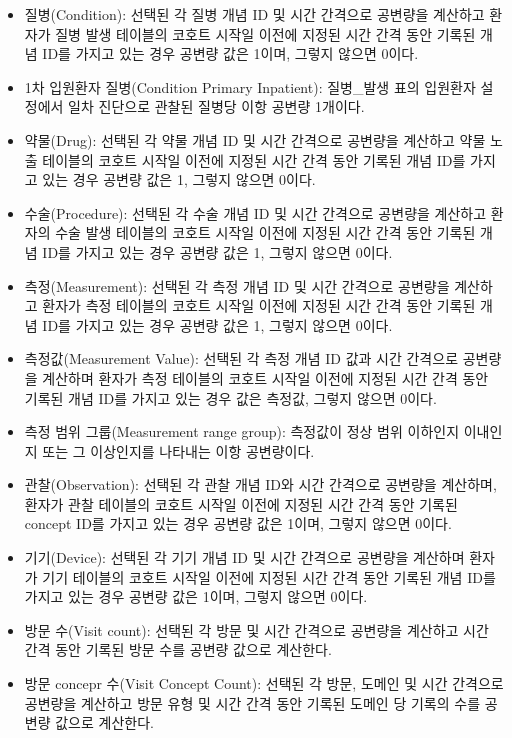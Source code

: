 \documentclass[11pt]{book}
\providecommand{\tightlist}{%
  \setlength{\itemsep}{0pt}\setlength{\parskip}{0pt}}
\theoremstyle{definition}
\theoremstyle{definition}
\theoremstyle{definition}
\theoremstyle{remark}
\begin{document}
\begin{itemize}
\tightlist
\item
  질병(Condition): 선택된 각 질병 개념 ID 및 시간 간격으로 공변량을
  계산하고 환자가 질병 발생 테이블의 코호트 시작일 이전에 지정된 시간
  간격 동안 기록된 개념 ID를 가지고 있는 경우 공변량 값은 1이며, 그렇지
  않으면 0이다.
\item
  1차 입원환자 질병(Condition Primary Inpatient): 질병\_발생 표의
  입원환자 설정에서 일차 진단으로 관찰된 질병당 이항 공변량 1개이다.
\item
  약물(Drug): 선택된 각 약물 개념 ID 및 시간 간격으로 공변량을 계산하고
  약물 노출 테이블의 코호트 시작일 이전에 지정된 시간 간격 동안 기록된
  개념 ID를 가지고 있는 경우 공변량 값은 1, 그렇지 않으면 0이다.
\item
  수술(Procedure): 선택된 각 수술 개념 ID 및 시간 간격으로 공변량을
  계산하고 환자의 수술 발생 테이블의 코호트 시작일 이전에 지정된 시간
  간격 동안 기록된 개념 ID를 가지고 있는 경우 공변량 값은 1, 그렇지
  않으면 0이다.
\item
  측정(Measurement): 선택된 각 측정 개념 ID 및 시간 간격으로 공변량을
  계산하고 환자가 측정 테이블의 코호트 시작일 이전에 지정된 시간 간격
  동안 기록된 개념 ID를 가지고 있는 경우 공변량 값은 1, 그렇지 않으면
  0이다.
\item
  측정값(Measurement Value): 선택된 각 측정 개념 ID 값과 시간 간격으로
  공변량을 계산하며 환자가 측정 테이블의 코호트 시작일 이전에 지정된
  시간 간격 동안 기록된 개념 ID를 가지고 있는 경우 값은 측정값, 그렇지
  않으면 0이다.
\item
  측정 범위 그룹(Measurement range group): 측정값이 정상 범위 이하인지
  이내인지 또는 그 이상인지를 나타내는 이항 공변량이다.
\item
  관찰(Observation): 선택된 각 관찰 개념 ID와 시간 간격으로 공변량을
  계산하며, 환자가 관찰 테이블의 코호트 시작일 이전에 지정된 시간 간격
  동안 기록된 concept ID를 가지고 있는 경우 공변량 값은 1이며, 그렇지
  않으면 0이다.
\item
  기기(Device): 선택된 각 기기 개념 ID 및 시간 간격으로 공변량을
  계산하며 환자가 기기 테이블의 코호트 시작일 이전에 지정된 시간 간격
  동안 기록된 개념 ID를 가지고 있는 경우 공변량 값은 1이며, 그렇지
  않으면 0이다.
\item
  방문 수(Visit count): 선택된 각 방문 및 시간 간격으로 공변량을
  계산하고 시간 간격 동안 기록된 방문 수를 공변량 값으로 계산한다.
\item
  방문 concepr 수(Visit Concept Count): 선택된 각 방문, 도메인 및 시간
  간격으로 공변량을 계산하고 방문 유형 및 시간 간격 동안 기록된 도메인
  당 기록의 수를 공변량 값으로 계산한다.
\end{itemize}
\end{document}
